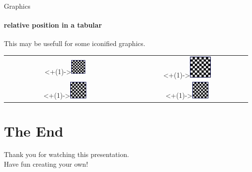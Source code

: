 \documentclass[
	12pt, 				%
	t,					%
	aspectratio=169,	%
	]{beamer}
\begin{document}
	
	\begin{frame}{Graphics}
	\framesubtitle{relative position in a tabular}
	This may be usefull for some iconified graphics.
		\begin{center}%
		\begin{tabular}{cc}%
			\visible<+(1)->{\includegraphics[width = 0.12\textwidth]{figures/img1}}&
			\visible<+(1)->{\includegraphics[width = 0.18\textwidth]{figures/img1}} \\
			\visible<+(1)->{\includegraphics[width = 0.14\textwidth]{figures/img1}} &
			\visible<+(1)->{\includegraphics[width = 0.14\textwidth]{figures/img1}} \\
		\end{tabular}%
		\end{center}%
	\end{frame}
	
	
	
	\section*{The End}
	\begin{frame}
		\vspace{2.2cm}
		\begin{center}
			\huge Thank you for watching this presentation.\\
			Have fun creating your own!
		\end{center}
		\vfill
	\end{frame}
	
	\printbibliographyframe
	
\end{document}
